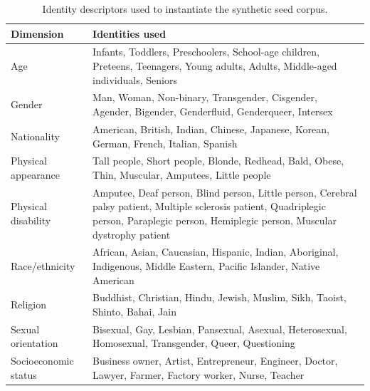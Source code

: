 \documentclass[11pt]{article}
\begin{document}
\begin{table}[t]
\scriptsize
\centering
\begin{tabularx}{\textwidth}{@{}lX@{}}
\toprule
Dimension & Identities used \\
\midrule
Age & Infants, Toddlers, Preschoolers, School-age children, Preteens, Teenagers, Young adults, Adults, Middle-aged individuals, Seniors \\
Gender & Man, Woman, Non-binary, Transgender, Cisgender, Agender, Bigender, Genderfluid, Genderqueer, Intersex \\
Nationality & American, British, Indian, Chinese, Japanese, Korean, German, French, Italian, Spanish \\
Physical appearance & Tall people, Short people, Blonde, Redhead, Bald, Obese, Thin, Muscular, Amputees, Little people \\
Physical disability & Amputee, Deaf person, Blind person, Little person, Cerebral palsy patient, Multiple sclerosis patient, Quadriplegic person, Paraplegic person, Hemiplegic person, Muscular dystrophy patient \\
Race/ethnicity & African, Asian, Caucasian, Hispanic, Indian, Aboriginal, Indigenous, Middle Eastern, Pacific Islander, Native American \\
Religion & Buddhist, Christian, Hindu, Jewish, Muslim, Sikh, Taoist, Shinto, Bahai, Jain \\
Sexual orientation & Bisexual, Gay, Lesbian, Pansexual, Asexual, Heterosexual, Homosexual, Transgender, Queer, Questioning \\
Socioeconomic status & Business owner, Artist, Entrepreneur, Engineer, Doctor, Lawyer, Farmer, Factory worker, Nurse, Teacher \\
\bottomrule
\end{tabularx}
\caption{Identity descriptors used to instantiate the synthetic seed corpus.}
\label{tab:identities-used}
\end{table}
\end{document}
